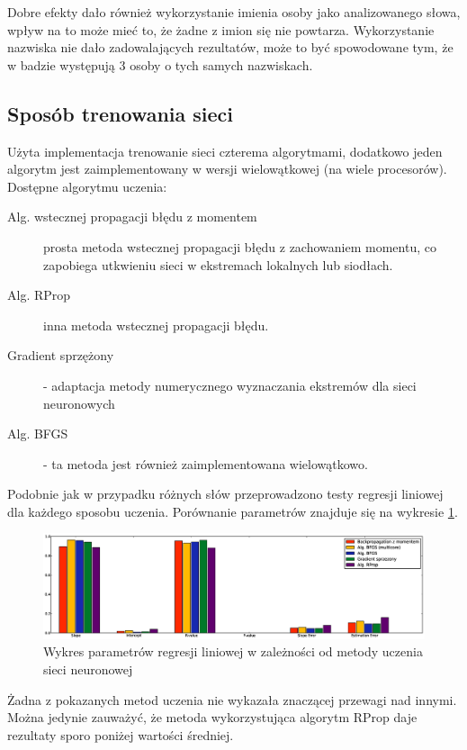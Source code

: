 \documentclass[a4paper]{article}
\begin{document}
Dobre efekty dało również wykorzystanie imienia osoby jako analizowanego słowa,
wpływ na to może mieć to, że żadne z imion się nie powtarza. Wykorzystanie
nazwiska nie dało zadowalających rezultatów, może to być spowodowane tym, że w
badzie występują 3 osoby o tych samych nazwiskach.

\subsection{Sposób trenowania sieci}

Użyta implementacja trenowanie sieci czterema algorytmami, dodatkowo jeden
algorytm jest zaimplementowany w wersji wielowątkowej (na wiele procesorów).
Dostępne algorytmu uczenia:
\begin{description}
    \item[Alg. wstecznej propagacji błędu z momentem] prosta metoda wstecznej
        propagacji błędu z zachowaniem momentu, co zapobiega utkwieniu sieci
        w ekstremach lokalnych lub siodłach.
    \item[Alg. RProp] inna metoda wstecznej propagacji błędu.
    \item[Gradient sprzężony] - adaptacja metody numerycznego wyznaczania
        ekstremów dla sieci neuronowych
    \item[Alg. BFGS] - ta metoda jest również zaimplementowana wielowątkowo.

\end{description}
Podobnie jak w przypadku różnych słów przeprowadzono testy regresji liniowej
dla każdego sposobu uczenia. Porównanie parametrów znajduje się na wykresie
\ref{fig:train}.


\begin{figure}[h!]
    \includegraphics[width=\textwidth]{training_network_reggresion}
    \caption{Wykres parametrów regresji liniowej w zależności od metody uczenia
    sieci neuronowej}
    \label{fig:train}
\end{figure}

Żadna z pokazanych metod uczenia nie wykazała znaczącej przewagi nad innymi.
Można jedynie zauważyć, że metoda wykorzystująca algorytm RProp daje rezultaty
sporo poniżej wartości średniej.
\end{document}
